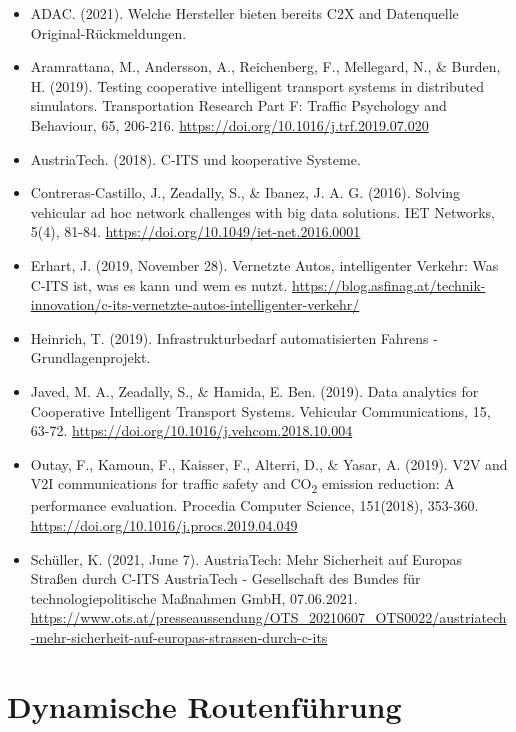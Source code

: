 \documentclass[
]{book}
\providecommand{\tightlist}{%
  \setlength{\itemsep}{0pt}\setlength{\parskip}{0pt}}
\begin{document}
\begin{itemize}
\tightlist
\item
  ADAC. (2021). Welche Hersteller bieten bereits C2X and Datenquelle Original-Rückmeldungen.
\item
  Aramrattana, M., Andersson, A., Reichenberg, F., Mellegard, N., \& Burden, H. (2019). Testing cooperative intelligent transport systems in distributed simulators. Transportation Research Part F: Traffic Psychology and Behaviour, 65, 206-216. \url{https://doi.org/10.1016/j.trf.2019.07.020}
\item
  AustriaTech. (2018). C-ITS und kooperative Systeme.
\item
  Contreras-Castillo, J., Zeadally, S., \& Ibanez, J. A. G. (2016). Solving vehicular ad hoc network challenges with big data solutions. IET Networks, 5(4), 81-84. \url{https://doi.org/10.1049/iet-net.2016.0001}
\item
  Erhart, J. (2019, November 28). Vernetzte Autos, intelligenter Verkehr: Was C-ITS ist, was es kann und wem es nutzt. \url{https://blog.asfinag.at/technik-innovation/c-its-vernetzte-autos-intelligenter-verkehr/}
\item
  Heinrich, T. (2019). Infrastrukturbedarf automatisierten Fahrens - Grundlagenprojekt.
\item
  Javed, M. A., Zeadally, S., \& Hamida, E. Ben. (2019). Data analytics for Cooperative Intelligent Transport Systems. Vehicular Communications, 15, 63-72. \url{https://doi.org/10.1016/j.vehcom.2018.10.004}
\item
  Outay, F., Kamoun, F., Kaisser, F., Alterri, D., \& Yasar, A. (2019). V2V and V2I communications for traffic safety and CO\textsubscript{2} emission reduction: A performance evaluation. Procedia Computer Science, 151(2018), 353-360. \url{https://doi.org/10.1016/j.procs.2019.04.049}
\item
  Schüller, K. (2021, June 7). AustriaTech: Mehr Sicherheit auf Europas Straßen durch C-ITS \textbar{} AustriaTech - Gesellschaft des Bundes für technologiepolitische Maßnahmen GmbH, 07.06.2021. \url{https://www.ots.at/presseaussendung/OTS_20210607_OTS0022/austriatech-mehr-sicherheit-auf-europas-strassen-durch-c-its}
\end{itemize}

\hypertarget{dynamic_route}{%
\section{Dynamische Routenführung}\label{dynamic_route}}
\end{document}
